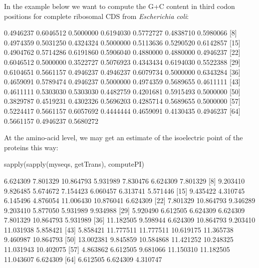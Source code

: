 \documentclass{article}
\begin{document}
In the example below we want to compute the G+C content in third codon
positions for complete ribosomal CDS from \textit{Escherichia coli}:

\begin{Schunk}
\begin{Soutput}
 [1] 0.4946237 0.6046512 0.5000000 0.6194030 0.5772727 0.4838710 0.5980066
 [8] 0.4974359 0.5031250 0.4324324 0.5000000 0.5113636 0.5290520 0.6142857
[15] 0.4904762 0.5714286 0.6191860 0.5906040 0.4880000 0.4880000 0.4946237
[22] 0.6046512 0.5000000 0.3522727 0.5076923 0.4343434 0.6194030 0.5522388
[29] 0.6104651 0.5661157 0.4946237 0.4946237 0.6079734 0.5000000 0.6343284
[36] 0.4659091 0.5789474 0.4946237 0.5000000 0.4974359 0.5689655 0.4611111
[43] 0.4611111 0.5303030 0.5303030 0.4482759 0.4201681 0.5915493 0.5000000
[50] 0.3829787 0.4519231 0.4302326 0.5696203 0.4285714 0.5689655 0.5000000
[57] 0.5224417 0.5661157 0.6057692 0.4444444 0.4659091 0.4130435 0.4946237
[64] 0.5661157 0.4946237 0.5680272
\end{Soutput}
\end{Schunk}

At the amino-acid level, we may get an estimate of the isoelectric point of
the proteins this way:

\begin{Schunk}
\begin{Sinput}
 sapply(sapply(myseqs, getTrans), computePI)
\end{Sinput}
\begin{Soutput}
 [1]  6.624309  7.801329 10.864793  5.931989  7.830476  6.624309  7.801329
 [8]  9.203410  9.826485  5.674672  7.154423  6.060457  6.313741  5.571446
[15]  9.435422  4.310745  6.145496  4.876054 11.006430 10.876041  6.624309
[22]  7.801329 10.864793  9.346289  9.203410  5.877050  5.931989  9.934988
[29]  5.920490  6.612505  6.624309  6.624309  7.801329 10.864793  5.931989
[36] 11.182505  9.598944  6.624309 10.864793  9.203410 11.031938  5.858421
[43]  5.858421 11.777511 11.777511 10.619175 11.365738  9.460987 10.864793
[50] 13.002381  9.845859 10.584868 11.421252 10.248325 11.031943 10.402075
[57]  4.863862  6.612505  9.681066 11.150310 11.182505 11.043607  6.624309
[64]  6.612505  6.624309  4.310747
\end{Soutput}
\end{Schunk}
\end{document}
